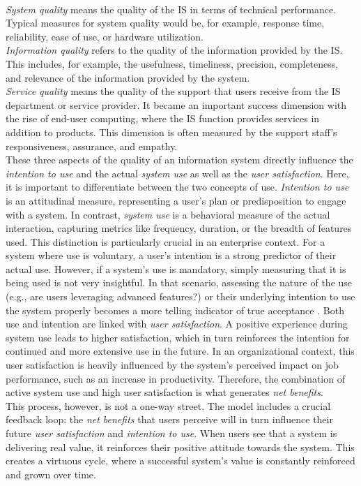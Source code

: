 \documentclass[
	english,
	ruledheaders=section,%
	class=report,%
	thesis={type=bachelor},%
	accentcolor=1b,%
	custommargins=true,%
	marginpar=false,%
	parskip=half-,%
	fontsize=11pt,%
	DIV=14,
]{tudapub}
\begin{document}
\\
\textit{System quality} means the quality of the IS in terms of technical performance. Typical measures for system quality would be, for example, response time, reliability, ease of use, or hardware utilization.\\
\textit{Information quality} refers to the quality of the information provided by the IS. This includes, for example, the usefulness, timeliness, precision, completeness, and relevance of the information provided by the system.\\
\textit{Service quality} means the quality of the support that users receive from the IS department or service provider. It became an important success dimension with the rise of end-user computing, where the IS function provides services in addition to products. This dimension is often measured by the support staff's responsiveness, assurance, and empathy.
\\
These three aspects of the quality of an information system directly influence the \textit{intention to use} and the actual \textit{system use} as well as the \textit{user satisfaction}. Here, it is important to differentiate between the two concepts of use. \textit{Intention to use} is an attitudinal measure, representing a user's plan or predisposition to engage with a system. In contrast, \textit{system use} is a behavioral measure of the actual interaction, capturing metrics like frequency, duration, or the breadth of features used. This distinction is particularly crucial in an enterprise context. For a system where use is voluntary, a user's intention is a strong predictor of their actual use. However, if a system's use is mandatory, simply measuring that it is being used is not very insightful. In that scenario, assessing the nature of the use (e.g., are users leveraging advanced features?) or their underlying intention to use the system properly becomes a more telling indicator of true acceptance 
\parencite{DeloneMcLean2003ISSuccessTenYearUpdate}. Both use and intention are linked with \textit{user satisfaction}. A positive experience during system use leads to higher satisfaction, which in turn reinforces the intention for continued and more extensive use in the future. In an organizational context, this user satisfaction is heavily influenced by the system's perceived impact on job performance, such as an increase in productivity. Therefore, the combination of active system use and high user satisfaction is what generates \textit{net benefits}.\\
This process, however, is not a one-way street. The model includes a crucial feedback loop: the \textit{net benefits} that users perceive will in turn influence their future \textit{user satisfaction} and \textit{intention to use}. When users see that a system is delivering real value, it reinforces their positive attitude towards the system. This creates a virtuous cycle, where a successful system's value is constantly reinforced and grown over time.
\newpage
\end{document}
